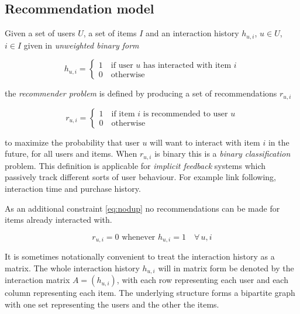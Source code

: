 
\subsection{Recommendation model}\label{sec:background:theory:model}

Given a set of users $U$, a set of items $I$ and an interaction history $h_{u, i}$, $u \in U$, $i \in I$ given in \textit{unweighted binary form}

\begin{equation}\label{eq:hist}
    h_{u, i} = \begin{cases}
        1 \quad \text{if user $u$ has interacted with item $i$} \\
        0 \quad \text{otherwise}
    \end{cases}
\end{equation}

the \textit{recommender problem} is defined by producing a set of recommendations $r_{u, i}$

\begin{equation}\label{eq:binrec}
    r_{u, i} = \begin{cases}
        1 \quad \text{if item $i$ is recommended to user $u$} \\
        0 \quad \text{otherwise}
    \end{cases}
\end{equation}

to maximize the probability that user $u$ will want to interact with item $i$ in the future, for all users and items.  When $r_{u, i}$ is binary this is a \textit{binary classification} problem. This definition is applicable for \textit{implicit feedback} systems which passively track different sorts of user behaviour. For example link following, interaction time and purchase history. 

As an additional constraint \eqref{eq:nodup} no recommendations can be made for items already interacted with.

\begin{equation}\label{eq:nodup}
    r_{u, i} = 0 \text{ whenever } h_{u, i} = 1 \quad \forall \, u, i
\end{equation}

It is sometimes notationally convenient to treat the interaction history as a matrix. The whole interaction history $h_{u, i}$ will in matrix form be denoted by the interaction matrix $A = (h_{u, i})$, with each row representing each user and each column representing each item. The underlying structure forms a bipartite graph with one set representing the users and the other the items.

